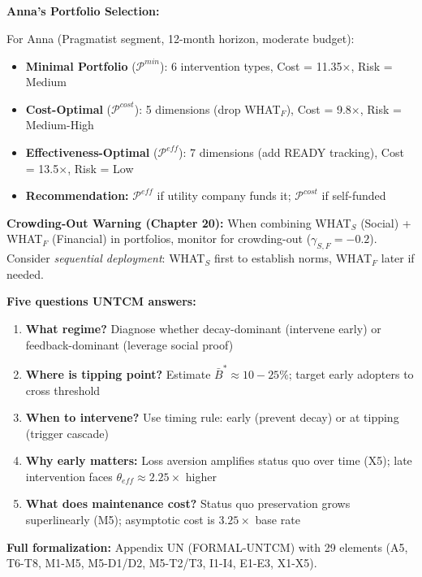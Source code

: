 \textbf{Anna's Portfolio Selection:}

For Anna (Pragmatist segment, 12-month horizon, moderate budget):
\begin{itemize}[nosep]
\item \textbf{Minimal Portfolio} ($\mathcal{P}^{min}$): 6 intervention types, Cost = 11.35$\times$, Risk = Medium
\item \textbf{Cost-Optimal} ($\mathcal{P}^{cost}$): 5 dimensions (drop WHAT$_F$), Cost = 9.8$\times$, Risk = Medium-High
\item \textbf{Effectiveness-Optimal} ($\mathcal{P}^{eff}$): 7 dimensions (add READY tracking), Cost = 13.5$\times$, Risk = Low
\item \textbf{Recommendation:} $\mathcal{P}^{eff}$ if utility company funds it; $\mathcal{P}^{cost}$ if self-funded
\end{itemize}

\textbf{Crowding-Out Warning (Chapter 20):} When combining WHAT$_S$ (Social) + WHAT$_F$ (Financial) in portfolios, monitor for crowding-out ($\gamma_{S,F} = -0.2$). Consider \textit{sequential deployment}: WHAT$_S$ first to establish norms, WHAT$_F$ later if needed.

\begin{tcolorbox}[colback=blue!5!white, colframe=blue!75!black, title=UNTCM Summary for Practitioners]
\textbf{Five questions UNTCM answers:}
\begin{enumerate}[nosep]
\item \textbf{What regime?} Diagnose whether decay-dominant (intervene early) or feedback-dominant (leverage social proof)
\item \textbf{Where is tipping point?} Estimate $\bar{B}^* \approx 10-25\%$; target early adopters to cross threshold
\item \textbf{When to intervene?} Use timing rule: early (prevent decay) or at tipping (trigger cascade)
\item \textbf{Why early matters:} Loss aversion amplifies status quo over time (X5); late intervention faces $\theta_{eff} \approx 2.25\times$ higher
\item \textbf{What does maintenance cost?} Status quo preservation grows superlinearly (M5); asymptotic cost is $3.25\times$ base rate
\end{enumerate}
\textbf{Full formalization:} Appendix UN (FORMAL-UNTCM) with 29 elements (A5, T6-T8, M1-M5, M5-D1/D2, M5-T2/T3, I1-I4, E1-E3, X1-X5).
\end{tcolorbox}

